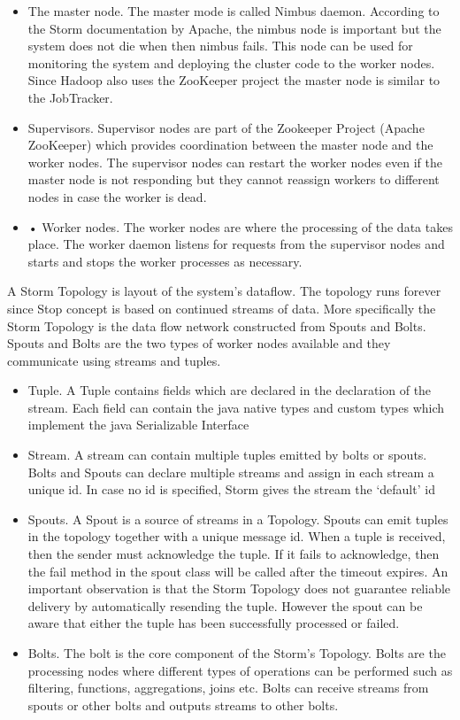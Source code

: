 \documentclass{lmproj}
\begin{document}
\begin{itemize}
	\item The master node. The master mode is called Nimbus daemon. According to the Storm documentation by Apache, the nimbus node is important but the system does not die when then nimbus fails. This node can be used for monitoring the system and deploying the cluster code to the worker nodes. Since Hadoop also uses the ZooKeeper project the master node is similar to the JobTracker.
	\item Supervisors. Supervisor nodes are part of the Zookeeper Project (Apache ZooKeeper) which provides coordination between the master node and the worker nodes. The supervisor nodes can restart the worker nodes even if the master node is not responding but they cannot reassign workers to different nodes in case the worker is dead.
	\item •	Worker nodes. The worker nodes are where the processing of the data takes place. The worker daemon listens for requests from the supervisor nodes and starts and stops the worker processes as necessary.
	
\end{itemize}

A Storm Topology is layout of the system’s dataflow. The topology runs forever since Stop concept is based on continued streams of data.  More specifically the Storm Topology is the data flow network constructed from Spouts and Bolts. Spouts and Bolts are the two types of worker nodes available and they communicate using streams and tuples. 

\begin{itemize}
	\item Tuple. A  Tuple contains fields which are declared in the declaration of the stream. Each field can contain the java native types and custom types which implement the java Serializable Interface
	\item Stream. A stream can contain multiple tuples emitted by bolts or spouts. Bolts and Spouts can declare multiple streams and assign in each stream a unique id. In case no id is specified, Storm gives the stream the ‘default’  id 
	\item Spouts. A Spout is a source of streams in a Topology. Spouts can emit tuples in the topology together with a unique message id. When a tuple is received, then the sender must acknowledge the tuple. If it fails to acknowledge, then the fail method in the spout class will be called after the timeout expires. An important observation is that the Storm Topology does not guarantee reliable delivery by automatically resending the tuple. However the spout can be aware that either the tuple has been successfully processed or failed.
	\item Bolts. The bolt is the core component of the Storm’s Topology. Bolts are the processing nodes where different types of operations can be performed such as filtering, functions, aggregations, joins etc. Bolts can receive streams from spouts or other bolts and outputs streams to other bolts.
\end{itemize}
\end{document}
